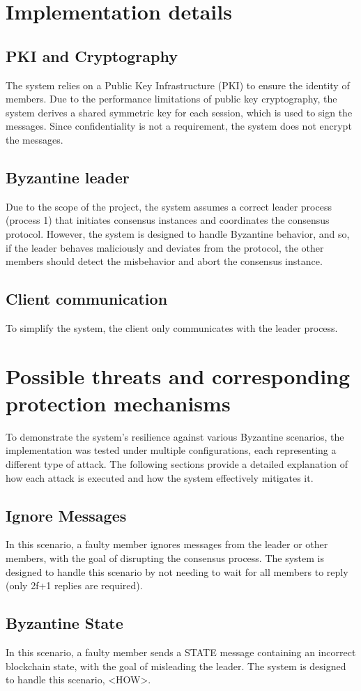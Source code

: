 \documentclass[runningheads]{llncs}
\begin{document}
%
\section{Implementation details}
\subsection{PKI and Cryptography}
The system relies on a Public Key Infrastructure (PKI) to ensure the identity of
members. Due to the performance limitations of public key cryptography, the
system derives a shared symmetric key for each session, which is used to sign
the messages. Since confidentiality is not a requirement, the system does not
encrypt the messages.
%
\subsection{Byzantine leader}
Due to the scope of the project, the system assumes a correct leader process
(process 1) that initiates consensus instances and coordinates the consensus
protocol. However, the system is designed to handle Byzantine behavior, and so,
if the leader behaves maliciously and deviates from the protocol, the other
members should detect the misbehavior and abort the consensus instance.
%
\subsection{Client communication}
To simplify the system, the client only communicates with the leader process.
%
\section{Possible threats and corresponding protection mechanisms} To
demonstrate the system's resilience against various Byzantine scenarios, the
implementation was tested under multiple configurations, each representing a
different type of attack. The following sections provide a detailed explanation
of how each attack is executed and how the system effectively mitigates it.
%
\subsection{Ignore Messages}
In this scenario, a faulty member ignores messages from the leader or other
members, with the goal of disrupting the consensus process. The system is
designed to handle this scenario by not needing to wait for all members to reply
(only 2f+1 replies are required).
%
\subsection{Byzantine State}
In this scenario, a faulty member sends a STATE message containing an incorrect
blockchain state, with the goal of misleading the leader. The system is designed
to handle this scenario, <HOW>.
%
\end{document}
